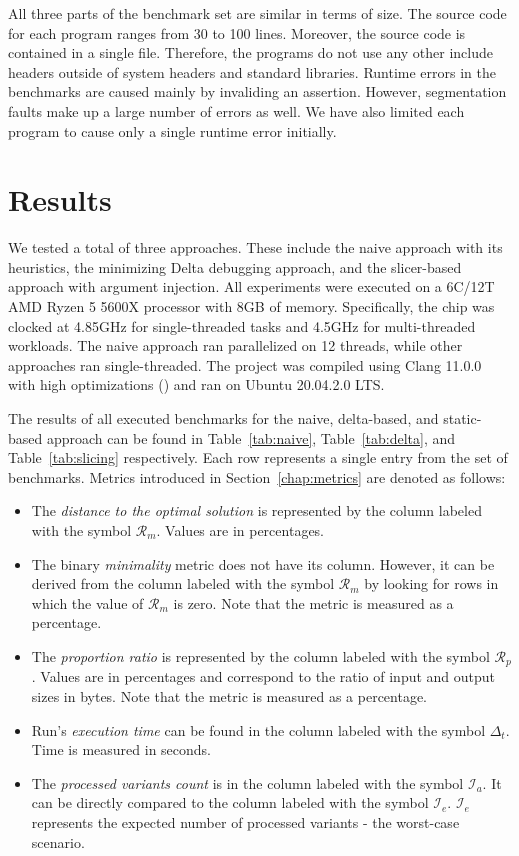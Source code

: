 All three parts of the benchmark set are similar in terms of size. 
The source code for each program ranges from 30 to 100 lines. 
Moreover, the source code is contained in a single file. 
Therefore, the programs do not use any other include headers outside of 
system headers and standard libraries. 
Runtime errors in the benchmarks are caused mainly by invaliding an assertion. 
However, segmentation faults make up a large number of errors as well. 
We have also limited each program to cause only a single runtime error 
initially.

\section{Results}

We tested a total of three approaches. 
These include the naive approach with its heuristics, the minimizing Delta 
debugging approach, and the slicer-based approach 
with argument injection. 
All experiments were executed on a 6C/12T AMD Ryzen 5 5600X processor with 
8GB of memory. 
Specifically, the chip was clocked at 4.85GHz for single-threaded tasks and 
4.5GHz for multi-threaded workloads. 
The naive approach ran parallelized on 12 threads, while other approaches 
ran single-threaded. 
The project was compiled using Clang 11.0.0 with high optimizations 
() and ran on Ubuntu 20.04.2.0 LTS.

The results of all executed benchmarks for the naive, delta-based, and 
static-based approach can be found in Table~\ref{tab:naive}, 
Table~\ref{tab:delta}, and Table~\ref{tab:slicing} respectively.
Each row represents a single entry from the set of benchmarks. 
Metrics introduced in Section~\ref{chap:metrics} are denoted as follows:
\begin{itemize}
  \item The \emph{distance to the optimal solution} is represented by the 
  column labeled with the symbol $\mathcal{R}_m$. 
  Values are in percentages.
  \item The binary \emph{minimality} metric does not have its column. 
  However, it can be derived from the column labeled with the symbol
  $\mathcal{R}_m$ by looking for rows in which the value of 
  $\mathcal{R}_m$ is zero.
  Note that the metric is measured as a percentage.
  \item The \emph{proportion ratio} is represented by the column labeled 
  with the symbol $\mathcal{R}_p$. 
  Values are in percentages and correspond to the ratio of input and output 
  sizes in bytes.
  Note that the metric is measured as a percentage.
  \item Run's \emph{execution time} can be found in the column labeled with 
  the symbol $\Delta_t$. 
  Time is measured in seconds.
  \item The \emph{processed variants count} is in the column labeled with 
  the symbol $\mathcal{I}_a$. 
  It can be directly compared to the column labeled with the symbol 
  $\mathcal{I}_e$. 
  $\mathcal{I}_e$ represents the expected number of processed variants - 
  the worst-case scenario.
\end{itemize}

